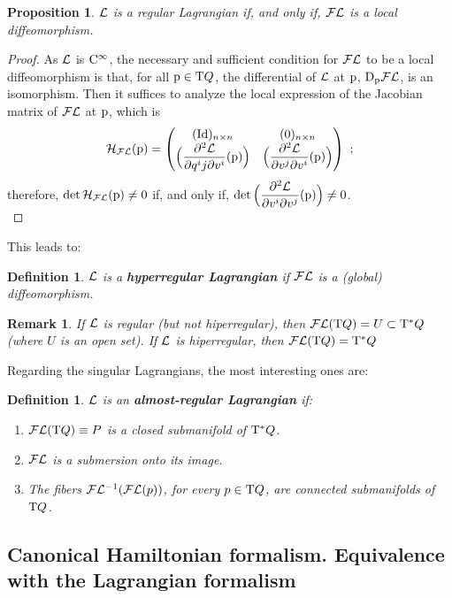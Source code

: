 \documentclass[12pt]{report}
\newtheorem{prop}[teor]{Proposition}
\newtheorem{definition}[teor]{Definition}
\newtheorem{remark}[teor]{Remark}
\def\ben{\begin{enumerate}}
\def\een{\end{enumerate}}
\def\qed{\ifvmode\removelastskip\fi
{\unskip\nobreak\hfil\penalty50\hbox{}\nobreak\hfil
\hbox{\vrule height1.2ex width1.2ex}\parfillskip=0pt
\finalhyphendemerits=0 \par\smallskip}}
\def\Lag{{\cal L}}
\def\Tan{{\rm T}}
\def\Cinfty{{\rm C}^\infty}
\def\Leg{{\cal F}\Lag}
\begin{document}
\begin{prop}
$\Lag$ is a regular Lagrangian if, and only if, $\Leg$ is a local diffeomorphism.
\end{prop}
\begin{proof}
As $\Lag$ is $\Cinfty$, the necessary and sufficient condition for
$\Leg$ to be a local diffeomorphism is that, for all ${\rm p}\in\Tan Q$,
the differential of $\Lag$ at ${\rm p}$,  ${\rm D}_{\rm p}\Leg$, is an isomorphism. 
Then it suffices to analyze the local expression 
of the Jacobian matrix of $\Leg$ at ${\rm p}$, which is
$$
{\cal H}_{{\cal F}\Lag}({\rm p})=
\left(\begin{matrix}
({\rm Id})_{n\times n}& (0)_{n\times n} \\
\Big(\displaystyle\frac{\partial^2\Lag}{\partial q^ij\partial v^i}({\rm p}) \Big)& \Big(\displaystyle\frac{\partial^2\Lag}{\partial v^j \partial v^i}({\rm p})\Big)
\end{matrix}\right) \ ;
$$
therefore, ${\rm det}\,{\cal H}_{{\cal F}\Lag}({\rm p})\not=0$
if, and only if, ${\rm det}\,\Big(\displaystyle\frac{\partial^2\Lag}{\partial v^i \partial v^j}({\rm p})\Big)\not=0$.
\\ \qed \end{proof}

This leads to:

\begin{definition}
$\Lag$ is a \textbf{hyperregular Lagrangian} if
$\Leg$ is a (global) diffeomorphism.
\end{definition}

\begin{remark}{\rm 
If $\Lag$ is regular (but not hiperregular), then $\Leg (\Tan Q)=U\subset\Tan^*Q$
(where $U$ is an open set).
If $\Lag$ is hiperregular, then $\Leg (\Tan Q)=\Tan^*Q$
}\end{remark}

Regarding the singular Lagrangians,  the most interesting ones are:

\begin{definition}
$\Lag$ is an \textbf{almost-regular Lagrangian} if:
\ben
\item
$\Leg(\Tan Q)\equiv P$ is a closed submanifold of $\Tan^*Q$.
\item
$\Leg$ is a submersion onto its image.
\item
The fibers $\Leg^{-1}(\Leg(p))$, for every $ p\in\Tan Q$, are connected submanifolds of $\Tan Q$.
\een
\end{definition}


\subsection{Canonical  Hamiltonian formalism. Equivalence with the Lagrangian formalism}
\label{canforma}
\end{document}
